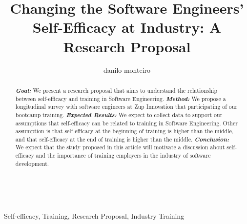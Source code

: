\documentclass[10pt, conference]{IEEEtran}
\author{danilo monteiro}
\begin{document}
\title{Changing the Software Engineers' Self-Efficacy at Industry: A Research Proposal} \\


\author{
\and
{}
\and
{}

}

\maketitle

\begin{abstract}
\textbf{\textit{Goal: }}We present a research proposal that aims to understand the relationship between self-efficacy and training in Software Engineering. \textbf{\textit{Method:}} We propose a longitudinal survey with software engineers at Zup Innovation that participating of our bootcamp training. \textbf{\textit{Expected Results:}} We expect to collect data to support our assumptions that self-efficacy can be related to training in Software Engineering. Other assumption is that self-efficacy at the beginning of training is higher than the middle, and that self-efficacy at the end of training is higher than the middle. \textbf{\textit{Conclusion:}} We expect that the study proposed in this article will motivate a discussion about self-efficacy and the importance of training employers in the industry of software development.
\end{abstract}

\begin{IEEEkeywords}
Self-efficacy, Training, Research Proposal, Industry Training
\end{IEEEkeywords}
\end{document}
